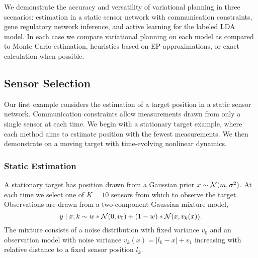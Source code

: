 
We demonstrate the accuracy and versatility of variational planning in
three scenarios: estimation in a static sensor network with
communication constraints, gene regulatory network inference, and
active learning for the labeled LDA model.  In each case we compare
variational planning on each model as compared to Monte Carlo
estimation, heuristics based on EP approximations, or exact
calculation when possible.  





\subsection{Sensor Selection}

Our first example considers the estimation of a target position in a
static sensor network.  Communication constraints allow measurements
drawn from only a single sensor at each time.  We begin with
a stationary target example, where each method aims to estimate
position with the fewest measurements.  We then demonstrate on a
moving target with time-evolving nonlinear dynamics.  

\subsubsection{Static Estimation}

A stationary target has position drawn from a Gaussian prior $x \sim
\mathcal{N}(m,\sigma^2)$.  At each time we select one of $K=10$
sensors from which to observe the target.  Observations are drawn from
a two-component Gaussian mixture model,
\[
  y \mid x; k \sim w * \mathcal{N}(0, v_0) + (1-w) * \mathcal{N}(x, v_k(x)).
\]
The mixture consists of a noise distribution with fixed variance $v_0$
and an observation model with noise variance \mbox{$v_k(x) = |l_k -
x| + v_1$} increasing with relative distance to a fixed sensor
position $l_k$.

